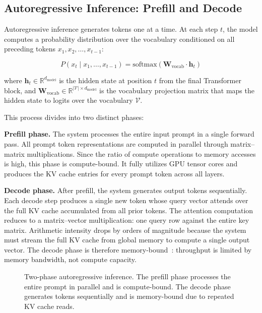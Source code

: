 \documentclass[
english,                 %
bibtex,                  %
]{kththesis}
\numberwithin{listing}{chapter}
\begin{document}
\subsection{Autoregressive Inference: Prefill and Decode}
\label{sec:bg-autoregressive}

Autoregressive inference generates tokens one at a time. At each step $t$, the model computes a probability distribution over the vocabulary conditioned on all preceding tokens $x_1, x_2, \ldots, x_{t-1}$:

\begin{equation}
\label{eq:autoregressive}
P(x_t \mid x_1, \ldots, x_{t-1}) = \text{softmax}(\mathbf{W}_{\text{vocab}} \cdot \mathbf{h}_t)
\end{equation}

\noindent where $\mathbf{h}_t \in \mathbb{R}^{d_{\text{model}}}$ is the hidden state at position $t$ from the final Transformer block, and $\mathbf{W}_{\text{vocab}} \in \mathbb{R}^{|\mathcal{V}| \times d_{\text{model}}}$ is the vocabulary projection matrix that maps the hidden state to logits over the vocabulary $\mathcal{V}$.

This process divides into two distinct phases:

\textbf{Prefill phase.} The system processes the entire input prompt in a single forward pass. All prompt token representations are computed in parallel through matrix--matrix multiplications. Since the ratio of compute operations to memory accesses is high, this phase is compute-bound. It fully utilizes \gls{GPU} tensor cores and produces the \gls{KV} cache entries for every prompt token across all layers.

\textbf{Decode phase.} After prefill, the system generates output tokens sequentially. Each decode step produces a single new token whose query vector attends over the full \gls{KV} cache accumulated from all prior tokens. The attention computation reduces to a matrix--vector multiplication: one query row against the entire key matrix. Arithmetic intensity drops by orders of magnitude because the system must stream the full \gls{KV} cache from global memory to compute a single output vector. The decode phase is therefore memory-bound~\cite{pope2023efficiently}: throughput is limited by memory bandwidth, not compute capacity.

\begin{figure}[H]
  \begin{center}
    
  \end{center}
  \caption{Two-phase autoregressive inference. The prefill phase processes the entire prompt in parallel and is compute-bound. The decode phase generates tokens sequentially and is memory-bound due to repeated \gls{KV} cache reads.}
  \label{fig:prefill-decode}
\end{figure}
\end{document}
